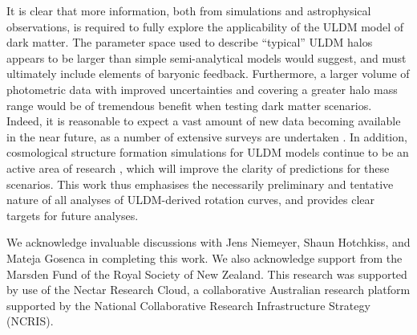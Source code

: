 \documentclass[a4paper,11pt]{article}
\begin{document}
It is clear that more information, both from simulations and astrophysical observations, is required to fully explore the applicability of the ULDM model of dark matter. The parameter space used to describe ``typical'' ULDM halos appears to be larger than simple semi-analytical models would suggest, and must ultimately include elements of baryonic feedback. Furthermore, a larger volume of photometric data with improved uncertainties and covering a greater halo mass range would be of tremendous benefit when testing dark matter scenarios. Indeed, it is reasonable to expect a vast amount of new data becoming available in the near future, as a number of extensive surveys are undertaken \cite{Simon:2019kmm}. In addition, cosmological structure formation simulations for ULDM models continue to be an active area of research \cite{Lin:2018whl, Clough:2018exo, Mocz:2015sda}, which will improve the clarity of predictions for these scenarios.  This work thus emphasises the necessarily preliminary and tentative nature of all analyses of ULDM-derived rotation curves, and provides clear targets for future analyses. 



\acknowledgments

We acknowledge invaluable discussions with Jens Niemeyer, Shaun Hotchkiss, and Mateja Gosenca in completing this work. We also acknowledge support from the Marsden Fund of the Royal Society of New Zealand. This research was supported by use of the Nectar Research Cloud, a collaborative Australian research platform supported by the National Collaborative Research Infrastructure Strategy (NCRIS).



 
\end{document}
